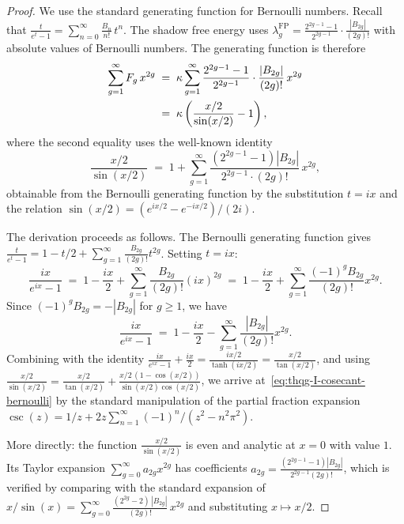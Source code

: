 \begin{proof}
We use the standard generating function for Bernoulli numbers. Recall that $\frac{t}{e^t - 1} = \sum_{n=0}^{\infty} \frac{B_n}{n!}\,t^n$. The shadow free energy uses $\lambda_g^{\mathrm{FP}} = \frac{2^{2g-1}-1}{2^{2g-1}}\cdot\frac{|B_{2g}|}{(2g)!}$ with absolute values of Bernoulli numbers. The generating function is therefore
\begin{align}
\sum_{g=1}^{\infty} F_g\,x^{2g} &\;=\; \kappa \sum_{g=1}^{\infty} \frac{2^{2g-1}-1}{2^{2g-1}} \cdot \frac{|B_{2g}|}{(2g)!}\,x^{2g} \notag\\
&\;=\; \kappa \left( \frac{x/2}{\sin(x/2)} - 1 \right), \label{eq:thqg-I-gf-derivation}
\end{align}
where the second equality uses the well-known identity
\begin{equation}\label{eq:thqg-I-cosecant-bernoulli}
\frac{x/2}{\sin(x/2)} \;=\; 1 + \sum_{g=1}^{\infty} \frac{(2^{2g-1}-1)|B_{2g}|}{2^{2g-1}\cdot(2g)!}\,x^{2g},
\end{equation}
obtainable from the Bernoulli generating function by the substitution $t = ix$ and the relation $\sin(x/2) = (e^{ix/2} - e^{-ix/2})/(2i)$.

The derivation proceeds as follows. The Bernoulli generating function gives $\frac{t}{e^t - 1} = 1 - t/2 + \sum_{g=1}^\infty \frac{B_{2g}}{(2g)!} t^{2g}$. Setting $t = ix$:
\[
\frac{ix}{e^{ix} - 1} \;=\; 1 - \frac{ix}{2} + \sum_{g=1}^\infty \frac{B_{2g}}{(2g)!}(ix)^{2g} \;=\; 1 - \frac{ix}{2} + \sum_{g=1}^\infty \frac{(-1)^g B_{2g}}{(2g)!} x^{2g}.
\]
Since $(-1)^g B_{2g} = -|B_{2g}|$ for $g \geq 1$, we have
\[
\frac{ix}{e^{ix}-1} \;=\; 1 - \frac{ix}{2} - \sum_{g=1}^\infty \frac{|B_{2g}|}{(2g)!}x^{2g}.
\]
Combining with the identity $\frac{ix}{e^{ix}-1} + \frac{ix}{2} = \frac{ix/2}{\tanh(ix/2)} = \frac{x/2}{\tan(x/2)}$, and using $\frac{x/2}{\sin(x/2)} = \frac{x/2}{\tan(x/2)} + \frac{x/2\,(1-\cos(x/2))}{\sin(x/2)\cos(x/2)}$, we arrive at~\eqref{eq:thqg-I-cosecant-bernoulli} by the standard manipulation of the partial fraction expansion $\csc(z) = 1/z + 2z\sum_{n=1}^\infty (-1)^n/(z^2 - n^2\pi^2)$.

More directly: the function $\frac{x/2}{\sin(x/2)}$ is even and analytic at $x = 0$ with value $1$. Its Taylor expansion $\sum_{g=0}^\infty a_{2g} x^{2g}$ has coefficients $a_{2g} = \frac{(2^{2g-1}-1)|B_{2g}|}{2^{2g-1}(2g)!}$, which is verified by comparing with the standard expansion of $x/\sin(x) = \sum_{g=0}^\infty \frac{(2^{2g}-2)\,|B_{2g}|}{(2g)!}\, x^{2g}$ and substituting $x \mapsto x/2$.
\end{proof}

